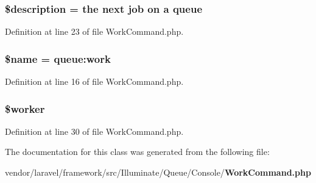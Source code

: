 \subsubsection[{\$description}]{\setlength{\rightskip}{0pt plus 5cm}\$description =  the next job {\bf on} {\bf a} {\bf queue}\textquotesingle{}\hspace{0.3cm}{\ttfamily [protected]}}\label{class_illuminate_1_1_queue_1_1_console_1_1_work_command_a87b032cba06009e3467abf1c8018d960}


Definition at line 23 of file Work\+Command.\+php.

\subsubsection[{\$name}]{\setlength{\rightskip}{0pt plus 5cm}\${\bf name} = \textquotesingle{}queue\+:work\textquotesingle{}\hspace{0.3cm}{\ttfamily [protected]}}\label{class_illuminate_1_1_queue_1_1_console_1_1_work_command_ab2fc40d43824ea3e1ce5d86dee0d763b}


Definition at line 16 of file Work\+Command.\+php.

\subsubsection[{\$worker}]{\setlength{\rightskip}{0pt plus 5cm}\$worker\hspace{0.3cm}{\ttfamily [protected]}}\label{class_illuminate_1_1_queue_1_1_console_1_1_work_command_acc96b7a4d76c3c869cb3c1bca5acb4d0}


Definition at line 30 of file Work\+Command.\+php.



The documentation for this class was generated from the following file\+:\begin{DoxyCompactItemize}
\item 
vendor/laravel/framework/src/\+Illuminate/\+Queue/\+Console/{\bf Work\+Command.\+php}\end{DoxyCompactItemize}
